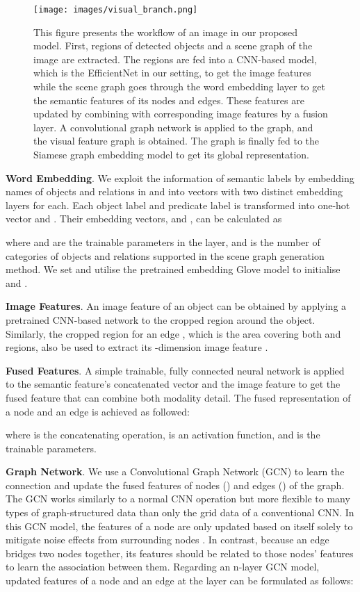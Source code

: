 \documentclass{IOS-Book-Article}
\begin{document}
\begin{figure}[h]
  \centering
  \texttt{[image: images/visual\_branch.png]}
  \caption{This figure presents the workflow of an image in our proposed model. First, regions of detected objects and a scene graph of the image are extracted. The regions are fed into a CNN-based model, which is the EfficientNet \cite{tan2019efficientnet} in our setting, to get the image features while the scene graph goes through the word embedding layer to get the semantic features of its nodes and edges. These features are updated by combining with corresponding image features by a fusion layer. A convolutional graph network is applied to the graph, and the visual feature graph is obtained. The graph is finally fed to the Siamese graph embedding model to get its global representation.}
  \label{fig:visual_branch}
\end{figure}

\textbf{Word Embedding}. We exploit the information of semantic labels by embedding names of objects and relations in  and  into vectors with two distinct embedding layers for each. Each object label  and predicate label  is transformed into one-hot vector  and .
Their embedding vectors,  and , can be calculated as


where  and  are the trainable parameters in the layer,  and  is the number of categories of objects and relations supported in the scene graph generation method.
We set  and utilise the pretrained embedding Glove model to initialise  and . 

\textbf{Image Features}. An image feature  of an object  can be obtained by applying a pretrained CNN-based network to the cropped region  around the object. Similarly, the cropped region for an edge , which is the area covering both  and  regions, also be used to extract its -dimension image feature .

\textbf{Fused Features}. A simple trainable, fully connected neural network is applied to the semantic feature's concatenated vector and the image feature to get the fused feature that can combine both modality detail. The fused representation of a node and an edge is achieved as followed:


where  is the concatenating operation,  is an activation function, and  is the trainable parameters.

\textbf{Graph Network}. We use a Convolutional Graph Network (GCN) to learn the connection and update the fused features of nodes () and edges () of the graph. The GCN works similarly to a normal CNN operation but more flexible to many types of graph-structured data than only the grid data of a conventional CNN. In this GCN model, the features of a node are only updated based on itself solely to mitigate noise effects from surrounding nodes \cite{wang2020cross}. In contrast, because an edge bridges two nodes together, its features should be related to those nodes' features to learn the association between them. Regarding an n-layer GCN model, updated features of a node and an edge at the  layer can be formulated as follows:
\end{document}
